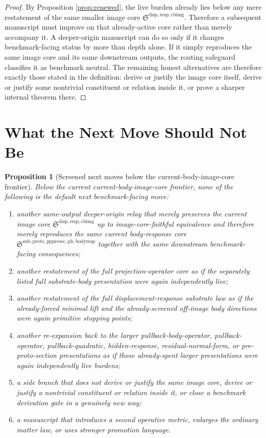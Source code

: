 \documentclass[11pt]{article}
\newcommand{\CurrentBodyImageCore}{\mathfrak S^{\mathrm{disp,resp,cbimg}}}
\newcommand{\PullbackBodyResponseCore}{\mathfrak S^{\mathrm{sub,proto,pppresec,pb,bodyresp}}}
\newtheorem{proposition}{Proposition}
\begin{document}
\begin{proof}
By Proposition \ref{prop:renewed}, the live burden already lies below any mere restatement of the same smaller image core \(\CurrentBodyImageCore\). Therefore a subsequent manuscript must improve on that already-active core rather than merely accompany it. A deeper-origin manuscript can do so only if it changes benchmark-facing status by more than depth alone. If it simply reproduces the same image core and its same downstream outputs, the routing safeguard classifies it as benchmark neutral. The remaining honest alternatives are therefore exactly those stated in the definition: derive or justify the image core itself, derive or justify some nontrivial constituent or relation inside it, or prove a sharper internal theorem there.
\end{proof}

\section{What the Next Move Should Not Be}

\begin{proposition}[Screened next moves below the current-body-image-core frontier]
Below the current current-body-image-core frontier, none of the following is the default next benchmark-facing move:
\begin{enumerate}
    \item another same-output deeper-origin relay that merely preserves the current image core \(\CurrentBodyImageCore\) up to image-core-faithful equivalence and therefore merely reproduces the same current body-response core \(\PullbackBodyResponseCore\) together with the same downstream benchmark-facing consequences;
    \item another restatement of the full projection-operator core as if the separately listed full substrate-body presentation were again independently live;
    \item another restatement of the full displacement-response substrate law as if the already-forced minimal lift and the already-screened off-image body directions were again primitive stopping points;
    \item another re-expansion back to the larger pullback-body-operator, pullback-operator, pullback-quadratic, hidden-response, residual-normal-form, or pre-proto-section presentations as if those already-spent larger presentations were again independently live burdens;
    \item a side branch that does not derive or justify the same image core, derive or justify a nontrivial constituent or relation inside it, or close a benchmark derivation gate in a genuinely new way;
    \item a manuscript that introduces a second operative metric, enlarges the ordinary matter law, or uses stronger promotion language.
\end{enumerate}
\end{proposition}
\end{document}
